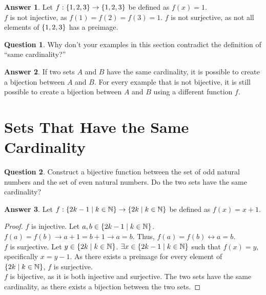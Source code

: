 \documentclass[article, 12pt]{article}
\theoremstyle{definition}
\newtheorem{question}{Question}
\newtheorem{answer}{Answer}
\DeclarePairedDelimiter\set{\{}{\}}
\newcommand{\nats}{\mathbb{N}}
\begin{document}
    \begin{answer}
        Let $f: \set*{1, 2, 3} \to \set*{1, 2, 3}$ be defined as $f(x) = 1$. 
        \\[12pt]
        $f$ is not injective, as $f(1) = f(2) = f(3) = 1$. $f$ is not surjective, as not all elements of $\set*{1, 2, 3}$ has a preimage.
    \end{answer}

    \begin{question}
        Why don't your examples in this section contradict the definition of ``same cardinality?''  
    \end{question}

    \begin{answer}
        If two sets $A$ and $B$ have the same cardinality, it is possible to create a bijection between $A$ and $B$. For every example that is not bijective, it is still possible to create a bijection between $A$ and $B$ using a different function $f$.
    \end{answer}

    \section{Sets That Have the Same Cardinality}
    \begin{question}
        Construct a bijective function between the set of odd natural numbers and the set of even natural numbers. Do the two sets have the same cardinality?
    \end{question}

    \begin{answer}
        Let $f: \set*{2k - 1 \mid k \in \nats} \to \set*{2k \mid k \in \nats}$ be defined as $f(x) = x + 1$.
        \begin{proof}
            $f$ is injective. Let $a,b \in \set*{2k - 1 \mid k \in \nats}$. $f(a) = f(b) \to a + 1 = b + 1 \to a = b$. Thus, $f(a) = f(b) \leftrightarrow a = b$.
            \\[12pt]
            $f$ is surjective. Let $y \in \set*{2k \mid k \in \nats}$. $\exists x \in \set*{2k - 1 \mid k \in \nats}$ such that $f(x) = y$, specifically $x = y-1$. As there exists a preimage for every element of $\set*{2k \mid k \in \nats}$, $f$ is surjective. 
            \\[12pt]
            $f$ is bijective, as it is both injective and surjective. The two sets have the same cardinality, as there exists a bijection between the two sets.
        \end{proof}
    \end{answer}
\end{document}
